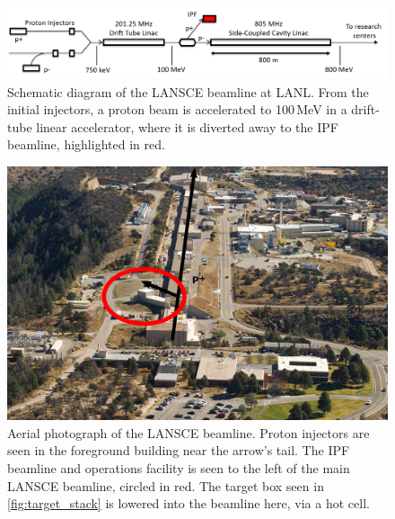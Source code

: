 



\begin{figure}
 \centering
 \includegraphics[width=0.75\columnwidth]{./figures/ipf_beamline_schematic.png}
 \caption{Schematic diagram of the LANSCE beamline at LANL. From the initial injectors, a proton beam is accelerated to 100\,MeV in a drift-tube linear accelerator, where it is diverted away to the IPF beamline, highlighted in red.}
 \label{fig:fe_beamline_schematic}
\end{figure}

\begin{figure}
 \centering
 \includegraphics[width=0.75\columnwidth]{./figures/ipf_beamline_alternate.png}
 \caption{Aerial photograph of the LANSCE beamline. Proton injectors are seen in the foreground building near the arrow's tail. The IPF beamline and operations facility is seen to the left of the main LANSCE beamline, circled in red.  The target box seen in \autoref{fig:target_stack} is lowered into the beamline here, via a hot cell.}
 \label{fig:fe_beamline_alternate}
\end{figure}





